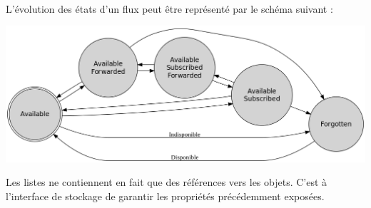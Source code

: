 \paragraph{}

L'évolution des états d'un flux peut être représenté par le schéma suivant :

\begin{center}
    \includegraphics[width=1\textwidth]{img/state.png}
\end{center}

Les listes ne contiennent en fait que des références vers les objets. C'est à l'interface de
stockage de garantir les propriétés précédemment exposées.

